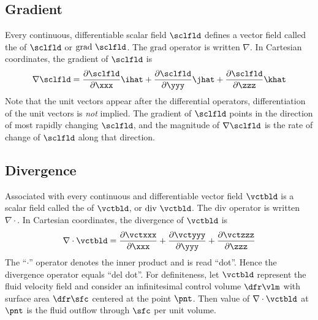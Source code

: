 \documentclass[12pt,twoside]{book}
\begin{document}
\subsection[Gradient]{Gradient}\label{sxn:grd_crt}
Every continuous, differentiable scalar field $\sclfld$ defines a vector 
field called the  of $\sclfld$ or $\mathrm{grad}\ \sclfld$.
The $\mathrm{grad}$ operator is written $\nabla$.
In Cartesian coordinates, the gradient of $\sclfld$ is 
\begin{equation}
\nabla \sclfld = 
\frac{\partial \sclfld}{\partial \xxx} \ihat + 
\frac{\partial \sclfld}{\partial \yyy} \jhat + 
\frac{\partial \sclfld}{\partial \zzz} \khat
\label{eqn:grd_crt}
\end{equation}
Note that the unit vectors appear after the differential operators, 
differentiation of the unit vectors is \textit{not} implied. 
The gradient of $\sclfld$ points in the direction of most rapidly
changing $\sclfld$, and the magnitude of $\nabla \sclfld$ is the rate
of change of $\sclfld$ along that direction.

\subsection[Divergence]{Divergence}\label{sxn:dvr_crt}
Associated with every continuous and differentiable vector field
$\vctbld$ is a scalar field called the  of
$\vctbld$, or $\mathrm{div}\ \vctbld$.
The $\mathrm{div}$ operator is written $\nabla \cdot$.
In Cartesian coordinates, the divergence of $\vctbld$ is 
\begin{equation}
\nabla \cdot \vctbld = 
\frac{\partial \vctxxx}{\partial \xxx} + 
\frac{\partial \vctyyy}{\partial \yyy} + 
\frac{\partial \vctzzz}{\partial \zzz} 
\label{eqn:dvr_crt}
\end{equation}
The ``$\cdot$'' operator denotes the inner product and is read ``dot''. 
Hence the divergence operator equals ``del dot''.
For definiteness, let $\vctbld$ represent the fluid velocity field and
consider an infinitesimal control volume $\dfr\vlm$ with surface area
$\dfr\sfc$ centered at the point $\pnt$. 
Then value of $\nabla \cdot \vctbld$ at $\pnt$ is the fluid outflow
through $\sfc$ per unit volume. 
\end{document}
